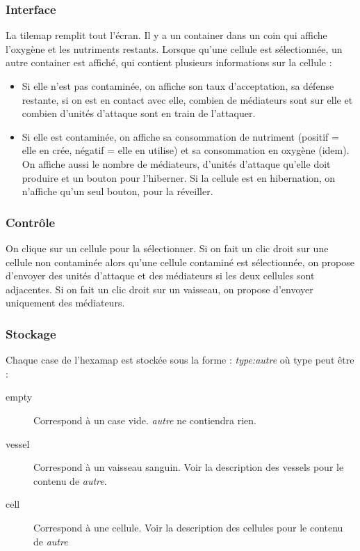 \documentclass{article}
\begin{document}
\subsubsection{Interface}
La tilemap remplit tout l'écran. Il y a un container dans un coin qui affiche l'oxygène et les nutriments restants. Lorsque qu'une cellule est sélectionnée, un autre container est affiché, qui contient plusieurs informations sur la cellule :
\begin{itemize}
	\item Si elle n'est pas contaminée, on affiche son taux d'acceptation, sa défense restante, si on est en contact avec elle, combien de médiateurs sont sur elle et combien d'unités d'attaque sont en train de l'attaquer.
	\item Si elle est contaminée, on affiche sa consommation de nutriment (positif = elle en crée, négatif = elle en utilise) et sa consommation en oxygène (idem). On affiche aussi le nombre de médiateurs, d'unités d'attaque qu'elle doit produire et un bouton pour l'hiberner. Si la cellule est en hibernation, on n'affiche qu'un seul bouton, pour la réveiller.
\end{itemize}

\subsubsection{Contrôle}
On clique sur un cellule pour la sélectionner. Si on fait un clic droit sur une cellule non contaminée alors qu'une cellule contaminé est sélectionnée, on propose d'envoyer des unités d'attaque et des médiateurs si les deux cellules sont adjacentes. Si on fait un clic droit sur un vaisseau, on propose d'envoyer uniquement des médiateurs.

\subsubsection{Stockage}
Chaque case de l'hexamap est stockée sous la forme : \emph{type:autre} où type peut être :
\begin{description}
	\item[empty] Correspond à un case vide. \emph{autre} ne contiendra rien.
	\item[vessel] Correspond à un vaisseau sanguin. Voir la description des vessels pour le contenu de \emph{autre}.
	\item[cell] Correspond à une cellule. Voir la description des cellules pour le contenu de \emph{autre}
\end{description}
\end{document}
